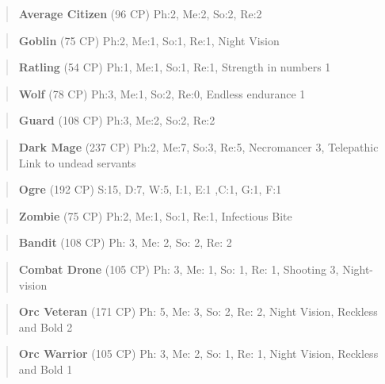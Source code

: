 \documentclass[11pt]{article}
\begin{document}
{\begin{quote}
\textbf{Average Citizen} (96 CP)
Ph:2, Me:2, So:2, Re:2
\end{quote}

\begin{quote}
\textbf{Goblin} (75 CP)
Ph:2, Me:1, So:1, Re:1, Night Vision
\end{quote}

\begin{quote}
\textbf{Ratling} (54 CP)
Ph:1, Me:1, So:1, Re:1, Strength in numbers 1
\end{quote}

\begin{quote}
\textbf{Wolf} (78 CP)
Ph:3, Me:1, So:2, Re:0, Endless endurance 1
\end{quote}

\begin{quote}
\textbf{Guard} (108 CP)
Ph:3, Me:2, So:2, Re:2
\end{quote}

\begin{quote}
\textbf{Dark Mage} (237 CP)
Ph:2, Me:7, So:3, Re:5, Necromancer 3, Telepathic Link to undead servants
\end{quote}

\begin{quote}
\textbf{Ogre} (192 CP)
S:15, D:7, W:5, I:1, E:1 ,C:1, G:1, F:1
\end{quote}

\begin{quote}
\textbf{Zombie} (75 CP)
Ph:2, Me:1, So:1, Re:1, Infectious Bite
\end{quote}

\begin{quote}
\textbf{Bandit} (108 CP)
Ph: 3, Me: 2, So: 2, Re: 2
\end{quote}

\begin{quote}
\textbf{Combat Drone} (105 CP)
Ph: 3, Me: 1, So: 1, Re: 1, Shooting 3, Night-vision
\end{quote}

\begin{quote}
\textbf{Orc Veteran} (171 CP)
Ph: 5, Me: 3, So: 2, Re: 2, Night Vision, Reckless and Bold 2
\end{quote}

\begin{quote}
\textbf{Orc Warrior} (105 CP)
Ph: 3, Me: 2, So: 1, Re: 1, Night Vision, Reckless and Bold 1
\end{quote}

}
\end{document}
